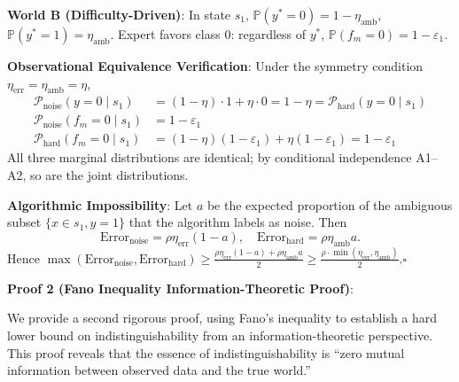 \documentclass[12pt,a4paper]{article}
\theoremstyle{definition}
\theoremstyle{remark}
\begin{document}
\textbf{World B (Difficulty-Driven)}: In state $s_1$, $\mathbb{P}(y^*=0)=1-\eta_{\text{amb}}$, $\mathbb{P}(y^*=1)=\eta_{\text{amb}}$. Expert favors class 0: regardless of $y^*$, $\mathbb{P}(f_m=0)=1-\varepsilon_1$.

\textbf{Observational Equivalence Verification}: Under the symmetry condition $\eta_{\text{err}}=\eta_{\text{amb}}=\eta$,
\begin{align}
\mathcal{P}_{\text{noise}}(y=0\mid s_1) &= (1-\eta)\cdot1 + \eta\cdot0 = 1-\eta = \mathcal{P}_{\text{hard}}(y=0\mid s_1) \\
\mathcal{P}_{\text{noise}}(f_m=0\mid s_1) &= 1-\varepsilon_1 \nonumber\\
\mathcal{P}_{\text{hard}}(f_m=0\mid s_1) &= (1-\eta)(1-\varepsilon_1) + \eta(1-\varepsilon_1) = 1-\varepsilon_1 \nonumber
\end{align}
All three marginal distributions are identical; by conditional independence A1--A2, so are the joint distributions.

\textbf{Algorithmic Impossibility}: Let $a$ be the expected proportion of the ambiguous subset $\{x\in s_1, y=1\}$ that the algorithm labels as noise. Then
\begin{equation}
\mathrm{Error}_{\text{noise}} = \rho\eta_{\text{err}}(1-a), \quad \mathrm{Error}_{\text{hard}} = \rho\eta_{\text{amb}} a.
\end{equation}
Hence $\max(\mathrm{Error}_{\text{noise}}, \mathrm{Error}_{\text{hard}}) \geq \frac{\rho\eta_{\text{err}}(1-a) + \rho\eta_{\text{amb}} a}{2} \geq \frac{\rho \cdot \min(\eta_{\text{err}}, \eta_{\text{amb}})}{2}$.\hfill$\square$

\bigskip
\textbf{Proof 2 (Fano Inequality Information-Theoretic Proof)}:

We provide a second rigorous proof, using Fano's inequality to establish a hard lower bound on indistinguishability from an information-theoretic perspective. This proof reveals that the essence of indistinguishability is ``zero mutual information between observed data and the true world.''
\end{document}
